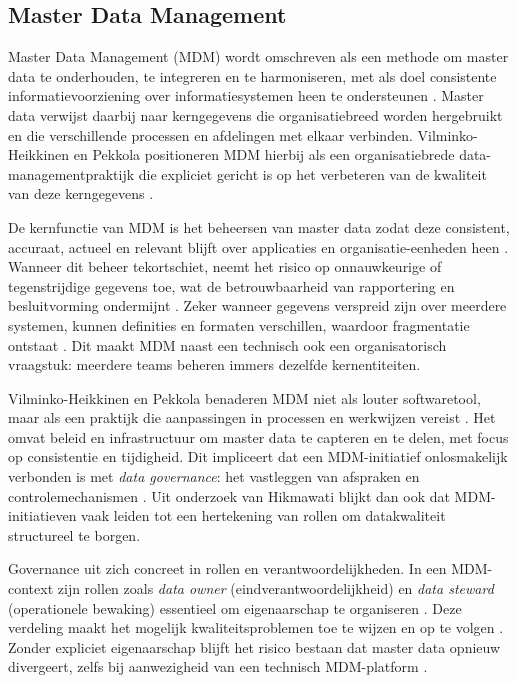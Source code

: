 \subsection{Master Data Management}
Master Data Management (MDM) wordt omschreven als een methode om master data te onderhouden, te integreren en te harmoniseren, met als doel consistente informatievoorziening over informatiesystemen heen te ondersteunen \autocite{Hikmawati}. Master data verwijst daarbij naar kerngegevens die organisatiebreed worden hergebruikt en die verschillende processen en afdelingen met elkaar verbinden. Vilminko-Heikkinen en Pekkola positioneren MDM hierbij als een organisatiebrede data-managementpraktijk die expliciet gericht is op het verbeteren van de kwaliteit van deze kerngegevens \autocite{VilminkoHeikkinenPekkola2019}.

De kernfunctie van MDM is het beheersen van master data zodat deze consistent, accuraat, actueel en relevant blijft over applicaties en organisatie-eenheden heen \autocite{Hikmawati}. Wanneer dit beheer tekortschiet, neemt het risico op onnauwkeurige of tegenstrijdige gegevens toe, wat de betrouwbaarheid van rapportering en besluitvorming ondermijnt \autocite{Hikmawati}. Zeker wanneer gegevens verspreid zijn over meerdere systemen, kunnen definities en formaten verschillen, waardoor fragmentatie ontstaat \autocite{VilminkoHeikkinenPekkola2019}. Dit maakt MDM naast een technisch ook een organisatorisch vraagstuk: meerdere teams beheren immers dezelfde kernentiteiten.

Vilminko-Heikkinen en Pekkola benaderen MDM niet als louter softwaretool, maar als een praktijk die aanpassingen in processen en werkwijzen vereist \autocite{VilminkoHeikkinenPekkola2019}. Het omvat beleid en infrastructuur om master data te capteren en te delen, met focus op consistentie en tijdigheid. Dit impliceert dat een MDM-initiatief onlosmakelijk verbonden is met \emph{data governance}: het vastleggen van afspraken en controlemechanismen \autocite{Hikmawati}. Uit onderzoek van Hikmawati blijkt dan ook dat MDM-initiatieven vaak leiden tot een hertekening van rollen om datakwaliteit structureel te borgen.

Governance uit zich concreet in rollen en verantwoordelijkheden. In een MDM-context zijn rollen zoals \emph{data owner} (eindverantwoordelijkheid) en \emph{data steward} (operationele bewaking) essentieel om eigenaarschap te organiseren \autocite{Hikmawati}. Deze verdeling maakt het mogelijk kwaliteitsproblemen toe te wijzen en op te volgen \autocite{VilminkoHeikkinenPekkola2019}. Zonder expliciet eigenaarschap blijft het risico bestaan dat master data opnieuw divergeert, zelfs bij aanwezigheid van een technisch MDM-platform \autocite{VilminkoHeikkinenPekkola2019}.

